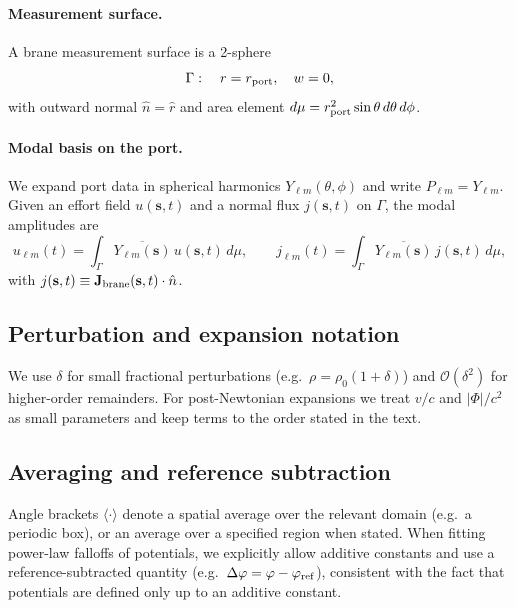 \documentclass[11pt]{article}
\begin{document}
\paragraph{Measurement surface.}
A brane measurement surface is a 2-sphere
\begin{equation}
  \Gamma:\quad r=r_{\rm port},\quad w=0,
\end{equation}
with outward normal $\hat n=\hat r$ and area element $d\mu=r_{\rm port}^2\sin\theta\,d\theta\,d\phi$.

\paragraph{Modal basis on the port.}
We expand port data in spherical harmonics $Y_{\ell m}(\theta,\phi)$ and write $P_{\ell m}=Y_{\ell m}$.
Given an effort field $u(\mathbf s,t)$ and a normal flux $j(\mathbf s,t)$ on $\Gamma$, the modal amplitudes are
\begin{equation}
  u_{\ell m}(t)=\int_\Gamma \overline{Y_{\ell m}(\mathbf s)}\,u(\mathbf s,t)\,d\mu,
  \qquad
  j_{\ell m}(t)=\int_\Gamma \overline{Y_{\ell m}(\mathbf s)}\,j(\mathbf s,t)\,d\mu,
\end{equation}
with $j(\mathbf s,t)\equiv \mathbf J_{\rm brane}(\mathbf s,t)\cdot \hat n$.

\subsection{Perturbation and expansion notation}

We use $\delta$ for small fractional perturbations (e.g.\ $\rho=\rho_0(1+\delta)$) and
$\mathcal O(\delta^2)$ for higher-order remainders.
For post-Newtonian expansions we treat $v/c$ and $|\Phi|/c^2$ as small parameters and keep terms to the
order stated in the text.

\subsection{Averaging and reference subtraction}

Angle brackets $\langle\cdot\rangle$ denote a spatial average over the relevant domain (e.g.\ a periodic box),
or an average over a specified region when stated.
When fitting power-law falloffs of potentials, we explicitly allow additive constants and use a reference-subtracted
quantity (e.g.\ $\Delta\varphi=\varphi-\varphi_{\rm ref}$), consistent with the fact that potentials are defined
only up to an additive constant.
\end{document}
